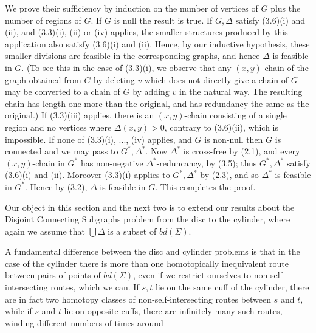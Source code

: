  We prove their sufficiency by induction on the number of vertices of $G$ plus the number of regions of $G$. If $G$ is null the result is true. If $G, \Delta$ satisfy (3.6)(i) and (ii), and (3.3)(i), (ii) or (iv) applies, the smaller structures produced by this application also satisfy (3.6)(i) and (ii). Hence, by our inductive hypothesis, these smaller divisions are feasible in the corresponding graphs, and hence $\Delta$ is feasible in $G$. (To see this in the case of (3.3)(i), we observe that any $(x, y)$-chain of the graph obtained from $G$ by deleting $v$ which does not directly give a chain of $G$ may be converted to a chain of $G$ by adding $v$ in the natural way. The resulting chain has length one more than the original, and has redundancy the same as the original.) If (3.3)(iii) applies, there is an $(x, y)$-chain consisting of a single region and no vertices where $\Delta(x, y) > 0$, contrary to (3.6)(ii), which is impossible. If none of (3.3)(i), ..., (iv) applies, and $G$ is non-null then $G$ is connected and we may pass to $G^*, \Delta^*$. Now $\Delta^*$ is cross-free by (2.1), and every $(x, y)$-chain in $G^*$ has non-negative $\Delta^*$-reduncancy, by (3.5); thus $G^*, \Delta^*$ satisfy (3.6)(i) and (ii). Moreover (3.3)(i) applies to $G^*, \Delta^*$ by (2.3), and so $\Delta^*$ is feasible in $G^*$. Hence by (3.2), $\Delta$ is feasible in $G$. This completes the proof.


Our object in this section and the next two is to extend our results about the Disjoint Connecting Subgraphs problem from the disc to the cylinder, where again we assume that $\bigcup \Delta$ is a subset of $bd(\Sigma)$.

A fundamental difference between the disc and cylinder problems is that in the case of the cylinder there is more than one homotopically inequivalent route between pairs of points of $bd(\Sigma)$, even if we restrict ourselves to non-self-intersecting routes, which we can. If $s, t$ lie on the same cuff of the cylinder, there are in fact two homotopy classes of non-self-intersecting routes between $s$ and $t$, while if $s$ and $t$ lie on opposite cuffs, there are infinitely many such routes, winding different numbers of times around
